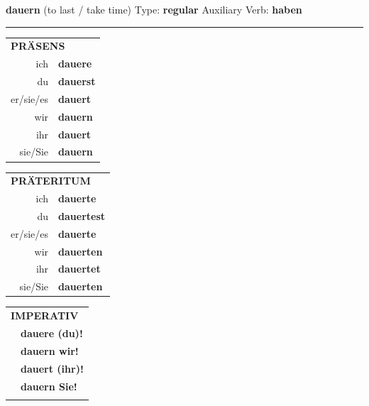 \documentclass[10pt,a4paper]{revtex4-2}
\begin{document}
\begin{verbbox}
    {\Large \bf dauern} (to last / take time) \hfill Type: \textbf{regular} \hfill Auxiliary Verb: \textbf{haben} 
    
     \vspace{5pt}

    \hrule
    
    \vspace{5pt}

  \begin{tabular}{rl}
     \multicolumn{2}{l}{\textbf{PRÄSENS} }\\
    ich & \textbf{dauere}\\
    du & \textbf{dauerst}\\
    er/sie/es & \textbf{dauert}\\
    wir & \textbf{dauern}\\
    ihr & \textbf{dauert}\\
    sie/Sie & \textbf{dauern}\\
  \end{tabular}
  \hfill
     \begin{tabular}{rl}
    \multicolumn{2}{l}{\textbf{PRÄTERITUM} }\\
    ich & \textbf{dauerte}\\
    du & \textbf{dauertest}\\
    er/sie/es & \textbf{dauerte}\\
    wir & \textbf{dauerten}\\
    ihr & \textbf{dauertet}\\
    sie/Sie & \textbf{dauerten}\\
  \end{tabular}
  \hfill
  \begin{tabular}{rl}
     \multicolumn{2}{l}{\textbf{IMPERATIV} }\\
   & \textbf{dauere (du)!}\\
   & \textbf{dauern wir!}\\
   & \textbf{dauert (ihr)!}\\
   & \textbf{dauern Sie!}\\
   & \vspace{10pt}
  \end{tabular}

    \vspace{10pt}


\end{verbbox}
\end{document}
